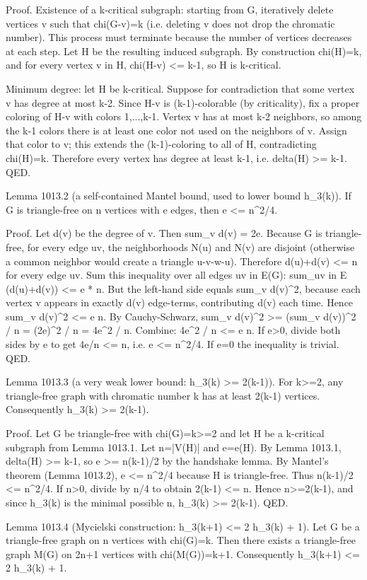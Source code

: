 Proof.
Existence of a k-critical subgraph: starting from G, iteratively delete vertices v such that chi(G-v)=k (i.e. deleting v does not drop the chromatic number). This process must terminate because the number of vertices decreases at each step. Let H be the resulting induced subgraph. By construction chi(H)=k, and for every vertex v in H, chi(H-v) <= k-1, so H is k-critical.

Minimum degree: let H be k-critical. Suppose for contradiction that some vertex v has degree at most k-2.
Since H-v is (k-1)-colorable (by criticality), fix a proper coloring of H-v with colors {1,...,k-1}.
Vertex v has at most k-2 neighbors, so among the k-1 colors there is at least one color not used on the neighbors of v. Assign that color to v; this extends the (k-1)-coloring to all of H, contradicting chi(H)=k.
Therefore every vertex has degree at least k-1, i.e. delta(H) >= k-1.  QED.

Lemma 1013.2 (a self-contained Mantel bound, used to lower bound h_3(k)).
If G is triangle-free on n vertices with e edges, then e <= n^2/4.

Proof.
Let d(v) be the degree of v. Then sum_v d(v) = 2e.
Because G is triangle-free, for every edge uv, the neighborhoods N(u) and N(v) are disjoint (otherwise a common neighbor would create a triangle u-v-w-u). Therefore d(u)+d(v) <= n for every edge uv.
Sum this inequality over all edges uv in E(G):
  sum_{uv in E} (d(u)+d(v)) <= e * n.
But the left-hand side equals sum_{v} d(v)^2, because each vertex v appears in exactly d(v) edge-terms, contributing d(v) each time.
Hence
  sum_v d(v)^2 <= e n.
By Cauchy-Schwarz,
  sum_v d(v)^2 >= (sum_v d(v))^2 / n = (2e)^2 / n = 4e^2 / n.
Combine:
  4e^2 / n <= e n.
If e>0, divide both sides by e to get 4e/n <= n, i.e. e <= n^2/4. If e=0 the inequality is trivial.
QED.

Lemma 1013.3 (a very weak lower bound: h_3(k) >= 2(k-1)).
For k>=2, any triangle-free graph with chromatic number k has at least 2(k-1) vertices. Consequently
  h_3(k) >= 2(k-1).

Proof.
Let G be triangle-free with chi(G)=k>=2 and let H be a k-critical subgraph from Lemma 1013.1.
Let n=|V(H)| and e=e(H).
By Lemma 1013.1, delta(H) >= k-1, so e >= n(k-1)/2 by the handshake lemma.
By Mantel's theorem (Lemma 1013.2), e <= n^2/4 because H is triangle-free.
Thus
  n(k-1)/2 <= n^2/4.
If n>0, divide by n/4 to obtain 2(k-1) <= n. Hence n>=2(k-1), and since h_3(k) is the minimal possible n, h_3(k) >= 2(k-1).
QED.

Lemma 1013.4 (Mycielski construction: h_3(k+1) <= 2 h_3(k) + 1).
Let G be a triangle-free graph on n vertices with chi(G)=k.
Then there exists a triangle-free graph M(G) on 2n+1 vertices with chi(M(G))=k+1.
Consequently h_3(k+1) <= 2 h_3(k) + 1.

